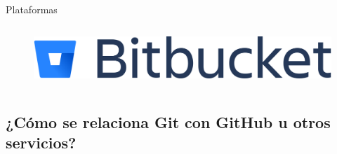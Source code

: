 \documentclass{beamer}
\begin{document}
\begin{frame}{Plataformas}
\begin{columns}
  \begin{column}{0.3\linewidth}
    \begin{figure}
      \includegraphics[width=1.2\textwidth]{images/logo_Bitbucket.png}
    \end{figure}
  \end{column}

 \end{columns}





 
\end{frame}

\subsection{¿Cómo se relaciona Git con GitHub u otros servicios?} 
\end{document}
